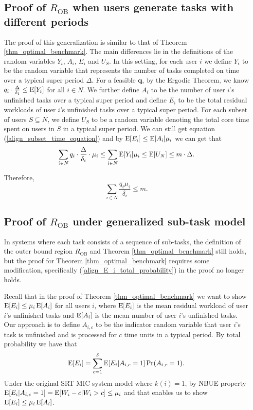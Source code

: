 \documentclass[prodmode,acmtompecs]{acmsmall}
\newcommand{\reqvec}{\mathbf{q}}
\newcommand{\reqscalar}{q}
\newcommand{\fullUserSet}{N}
\newcommand{\myComments}[1]{}
\newif\iftompecsextended
\newcommand{\tompecsextendedStart}{\iftompecsextended  \myComments{TOMPECS extended version: }}
\newcommand{\commentEnd}{\myComments{End}}
\begin{document}
\subsection{Proof of $R_\text{OB}$ when users generate tasks with different periods}
\label{appendix_pf_R_OB_diff_periods}
The proof of this generalization is similar to that of Theorem \ref{thm_optimal_benchmark}. The main differences lie in the definitions of the random variables $Y_i$, $A_i$, $E_i$ and $U_S$. 
In this setting, for each user $i$ we define $Y_i$ to be the random variable that represents the number of tasks completed on time over a typical super period $\Delta$. 
For a feasible $\reqvec$, by the Ergodic Theorem, we know $q_i \cdot \frac{\Delta}{\delta_i} \leq \operatorname*{\mathrm{E}}[Y_i]$ for all $i\in \fullUserSet$. 
We further define $A_i$ to be the number of user $i$'s unfinished tasks over a typical super period and define $E_i$ to be the total residual workloads of user $i$'s unfinished tasks over a typical super period. For each subset of users $S\subseteq \fullUserSet$, we define $U_S$ to be a random variable denoting the total core time spent on users in $S$ in a typical super period. We can still get equation (\ref{align_subset_time_equation}) and by $\operatorname*{\mathrm{E}}[E_i] \leq \operatorname*{\mathrm{E}}[A_i] \mu_i$ we can get that 
$$
\sum\limits_{i\in \fullUserSet} \reqscalar_i\cdot \frac{\Delta}{\delta_i} \cdot \mu_i \leq \sum\limits_{i\in \fullUserSet}\expectation[Y_i]\mu_i \leq \expectation[U_\fullUserSet] \leq m \cdot \Delta. 
$$

Therefore, 
$$
\sum\limits_{i\in \fullUserSet} \frac{\reqscalar_i\mu_i}{\delta_i} \leq m. 
$$
\commentEnd\fi

\tompecsextendedStart
\subsection{Proof of $R_\text{OB}$ under generalized sub-task model}
\label{appendix_pf_R_OB_subtask_model}
In systems where each task consists of a sequence of sub-tasks, the definition of the outer bound region $R_{\text{OB}}$ and Theorem \ref{thm_optimal_benchmark} still holds, but the proof for Theorem \ref{thm_optimal_benchmark} requires some modification, specifically (\ref{align_E_i_total_probability}) in the proof no longer holds. 

Recall that in the proof of Theorem \ref{thm_optimal_benchmark} we want to show $\operatorname*{\mathrm{E}}[E_i] \leq \mu_i \operatorname*{\mathrm{E}}[A_i]$ for all users $i$, where $\operatorname*{\mathrm{E}}[E_i]$ is the mean residual workload of user $i$'s unfinished tasks and $\operatorname*{\mathrm{E}}[A_i]$ is the mean number of user $i$'s unfinished tasks. Our approach is to define $A_{i,c}$ to be the indicator random variable that user $i$'s task is unfinished and is processed for $c$ time units in a typical period. 
By total probability we have that 
$$
\operatorname*{\mathrm{E}}[E_i] = \sum\limits_{c = 1}^{\delta} \operatorname*{\mathrm{E}}[E_i | A_{i, c} = 1] \Pr(A_{i,c} = 1). 
$$
Under the original SRT-MIC  system model where $k(i) = 1$, by NBUE property $\operatorname*{\mathrm{E}}[E_i | A_{i, c} = 1] = \operatorname*{\mathrm{E}}[W_i - c|W_i > c] \leq \mu_i$ and that enables us to show $\operatorname*{\mathrm{E}}[E_i] \leq \mu_i \operatorname*{\mathrm{E}}[A_i]$. 
\end{document}
